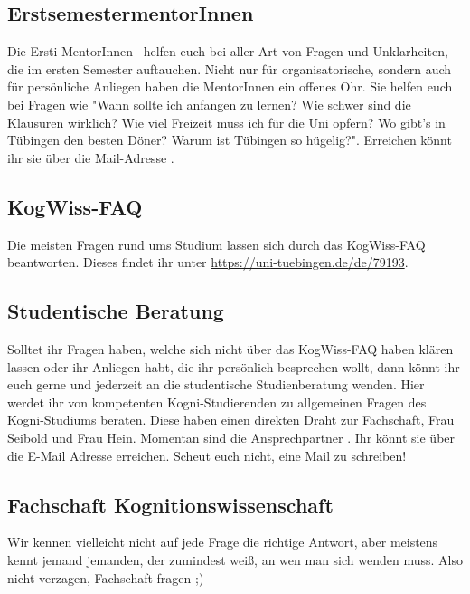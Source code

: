 
\subsection*{ErstsemestermentorInnen}
Die Ersti-MentorInnen \kognimentoren ~helfen euch bei aller Art von Fragen und Unklarheiten, die im ersten Semester auftauchen. Nicht nur für organisatorische, sondern auch für persönliche Anliegen haben die MentorInnen ein offenes Ohr. Sie helfen euch bei Fragen wie "Wann sollte ich anfangen zu lernen? Wie schwer sind die Klausuren wirklich? Wie viel Freizeit muss ich für die Uni opfern? Wo gibt's in Tübingen den besten Döner? Warum ist Tübingen so hügelig?". Erreichen könnt ihr sie über die Mail-Adresse . 

\subsection*{KogWiss-FAQ}
Die meisten Fragen rund ums Studium lassen sich durch das KogWiss-FAQ beantworten. Dieses findet ihr unter \url{https://uni-tuebingen.de/de/79193}.	%

\subsection*{Studentische Beratung}
Solltet ihr Fragen haben, welche sich nicht über das KogWiss-FAQ haben klären lassen oder ihr Anliegen habt, die ihr persönlich besprechen wollt, dann könnt ihr euch gerne und jederzeit an die studentische Studienberatung wenden. Hier werdet ihr von kompetenten Kogni-Studierenden zu allgemeinen Fragen des Kogni-Studiums beraten. Diese haben einen direkten Draht zur Fachschaft, Frau Seibold und Frau Hein.  Momentan sind die Ansprechpartner \studBeratung. Ihr könnt sie über die E-Mail Adresse  erreichen. Scheut euch nicht, eine Mail zu schreiben!

\subsection*{Fachschaft Kognitionswissenschaft}
Wir kennen vielleicht nicht auf jede Frage die richtige Antwort, aber meistens kennt jemand jemanden, der zumindest weiß, an wen man sich wenden muss. Also nicht verzagen, Fachschaft fragen ;)

